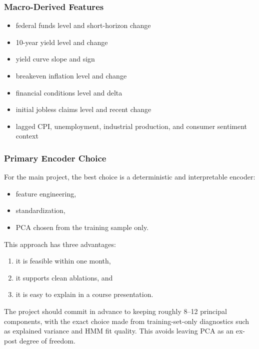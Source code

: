 \documentclass[11pt,a4paper]{article}
\begin{document}
\subsubsection{Macro-Derived Features}

\begin{itemize}[leftmargin=1.4em]
  \item federal funds level and short-horizon change
  \item 10-year yield level and change
  \item yield curve slope and sign
  \item breakeven inflation level and change
  \item financial conditions level and delta
  \item initial jobless claims level and recent change
  \item lagged CPI, unemployment, industrial production, and consumer sentiment context
\end{itemize}

\subsubsection{Primary Encoder Choice}

For the main project, the best choice is a deterministic and interpretable encoder:

\begin{itemize}[leftmargin=1.4em]
  \item feature engineering,
  \item standardization,
  \item PCA chosen from the training sample only.
\end{itemize}

This approach has three advantages:

\begin{enumerate}[leftmargin=1.5em]
  \item it is feasible within one month,
  \item it supports clean ablations, and
  \item it is easy to explain in a course presentation.
\end{enumerate}

The project should commit in advance to keeping roughly 8--12 principal components, with the exact choice made from training-set-only diagnostics such as explained variance and HMM fit quality. This avoids leaving PCA as an ex-post degree of freedom.
\end{document}
